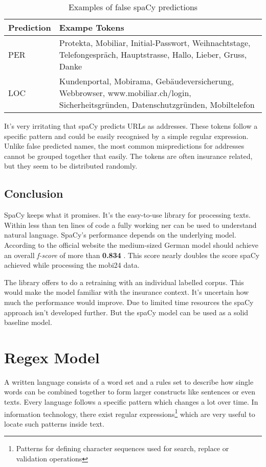 \begin{table}[h!]
    \centering
    \begin{tabular}{|C{6em}|L{25em}|}
        \hline
        \textbf{Prediction} & \textbf{Exampe Tokens} \\ [0.5ex]
        \hline
        PER & Protekta, Mobiliar, Initial-Passwort, Weihnachtstage, Telefongespräch, Hauptstrasse, Hallo, Lieber, Gruss, Danke \\ [0.5ex]
        \hline
        LOC & Kundenportal, Mobirama, Gebäudeversicherung, Webbrowser, www.mobiliar.ch/login, Sicherheitsgründen, Datenschutzgründen, Mobiltelefon \\ [1ex]
        \hline
    \end{tabular}
    \caption{Examples of false spaCy predictions}
    \label{tbl:spacy-wrong-predictions}
\end{table}

It's very irritating that spaCy predicts URLs as addresses. These tokens follow a specific pattern and could be easily recognised by a simple
regular expression. Unlike false predicted names, the most common mispredictions for addresses cannot be grouped together that easily. The tokens are
often insurance related, but they seem to be distributed randomly.

\subsection{Conclusion}

SpaCy keeps what it promises. It's the easy-to-use library for processing texts. Within less than ten lines of code a fully working \acrlong{ner} can
be used to understand natural language. SpaCy's performance depends on the underlying model. According to the official website the medium-sized German
model should achieve an overall \emph{f-score} of more than \textbf{0.834} \cite{spacy}. This score nearly doubles the score spaCy achieved while
processing the \gls{mobi24} data.

The library offers to do a retraining with an individual labelled corpus. This would make the model familiar with the insurance context. It's uncertain
how much the performance would improve. Due to limited time resources the spaCy approach isn't developed further. But the spaCy model can be used as a
solid baseline model.

\section{Regex Model}
\label{chap:regex-model}
A written language consists of a word set and a rules set to describe how single words can be combined together to form larger constructs
like sentences or even texts. Every language follows a specific pattern which changes a lot over time. In information technology, there exist
regular expressions\footnote{Patterns for defining character sequences used for search, replace or validation operations} which are very useful
to locate such patterns inside text.

